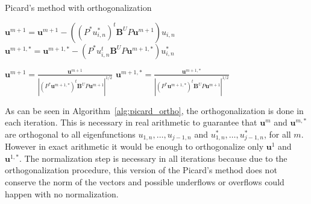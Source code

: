 \documentclass[smallextended]{svjour3}
\begin{document}
\begin{algorithm}[H] \caption{Picard's method with orthogonalization} \label{alg:picard_ortho} 
\begin{algorithmic}

    

\REPEAT



\STATE $\mathbf{u}^{m+1}=\mathbf{u}^{m+1}-((P^*u_{i,n}^*)^t\mathbf{B}^U P\mathbf{u}^{m+1})u_{i,n}$
\STATE $\mathbf{u}^{m+1,*}=\mathbf{u}^{m+1,*}-(P^*u_{i,n}^t\mathbf{B}^U P\mathbf{u}^{m+1,*})u_{i,n}^*$
\ENDFOR


\STATE $\displaystyle \mathbf{u}^{m+1}=\frac{\mathbf{u}^{m+1}}{|(P^*\mathbf{u}^{m+1,*})^t\mathbf{B}^U P\mathbf{u}^{m+1}|^{1/2}}$
\STATE $\displaystyle \mathbf{u}^{m+1,*}=\frac{\mathbf{u}^{m+1,*}}{|(P^*\mathbf{u}^{m+1,*})^t\mathbf{B}^U P\mathbf{u}^{m+1}|^{1/2}}$
\end{algorithmic}
\end{algorithm}

As can be seen in Algorithm~\ref{alg:picard_ortho}, the orthogonalization is done in each iteration. 
This is necessary in real arithmetic to guarantee that $\mathbf{u}^m$ and $\mathbf{u}^{m,*}$ are orthogonal to all 
eigenfunctions $u_{1,n},\dots,u_{j-1,n}$ and $u_{1,n}^*,\dots,u_{j-1,n}^*$, for all $m$. However in exact arithmetic it would 
be enough to orthogonalize only $\mathbf{u}^1$ and $\mathbf{u}^{1,*}$. The normalization step is necessary 
in all iterations because due to the orthogonalization procedure, this version of the Picard's 
method does not conserve the norm of the vectors and possible underflows or overflows could 
happen with no normalization.\\
\end{document}
